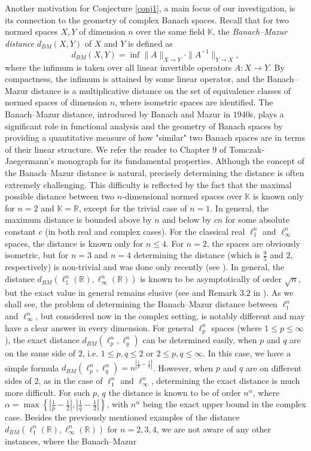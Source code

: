 \documentclass[12pt, a4paper]{article}
\theoremstyle{plain} %
\theoremstyle{definition} %
\theoremstyle{remark} %
\begin{document}
Another motivation for Conjecture \ref{conj1}, a main focus of our investigation, is its connection to the geometry of complex Banach spaces. Recall that for two normed spaces $X, Y$ of dimension $n$ over the same field $\mathbb{K}$, the \emph{Banach--Mazur distance} $d_{BM}(X, Y)$ of $X$ and $Y$ is defined as
$$d_{BM}(X, Y) = \inf \|A\|_{X \to Y} \cdot \|A^{-1}\|_{Y \to X},$$
where the infimum is taken over all linear invertible operators $A: X \to Y$. By compactness, the infimum is attained by some linear operator, and the Banach--Mazur distance is a multiplicative distance on the set of equivalence classes of normed spaces of dimension $n$, where isometric spaces are identified. The Banach--Mazur distance, introduced by Banach and Mazur in $1940$s, plays a significant role in functional analysis and the geometry of Banach spaces by providing a quantitative measure of how "similar" two Banach spaces are in terms of their linear structure. We refer the reader to Chapter $9$ of Tomczak-Jaegermann's monograph \cite{ntj} for its fundamental properties.  Although the concept of the Banach--Mazur distance is natural, precisely determining the distance is often extremely challenging. This difficulty is reflected by the fact that the maximal possible distance between two $n$-dimensional normed spaces over $\mathbb{K}$ is known only for $n=2$ and $\mathbb{K}=\mathbb{R}$, except for the trivial case of $n=1$. In general, the maximum distance is bounded above by $n$ and below by $cn$ for some absolute constant $c$ (in both real and complex cases). For the classical real $\ell_1^n$ and $\ell_{\infty}^n$ spaces, the distance is known only for $n \leq 4$. For $n=2$, the spaces are obviously isometric, but for $n=3$ and $n=4$ determining the distance (which is $\frac{9}{5}$ and $2$, respectively) is non-trivial and was done only recently (see \cite{kobosvarivoda}). In general, the distance $d_{BM}(\ell_1^n(\mathbb{R}), \ell_{\infty}^n(\mathbb{R}))$ is known to be asymptotically of order $\sqrt{n}$, but the exact value in general remains elusive (see \cite{xue} and Remark $3.2$ in \cite{kobosvarivoda}). As we shall see, the problem of determining the Banach--Mazur distance between $\ell_1^n$ and $\ell_{\infty}^n$, but considered now in the complex setting, is notably different and may have a clear answer in every dimension. For general $\ell_p^n$ spaces (where $1 \leq p \leq \infty$), the exact distance $d_{BM}(\ell_p^n, \ell_q^n)$ can be determined easily, when $p$ and $q$ are on the same side of $2$, i.e. $1 \leq p, q \leq 2$ or $2 \leq p, q \leq \infty$. In this case, we have a simple formula $d_{BM}(\ell_p^n, \ell_q^n)=n^{\left |\frac{1}{p}-\frac{1}{q} \right |}$. However, when $p$ and $q$ are on different sides of $2$, as in the case of $\ell_1^n$ and $\ell_{\infty}^n$, determining the exact distance is much more difficult. For such $p$, $q$ the distance is known to be of order  $n^{\alpha}$, where $\alpha = \max \left \{ \left | \frac{1}{p}-\frac{1}{2} \right |,  \left | \frac{1}{q}-\frac{1}{2} \right | \right \}$, with $n^{\alpha}$ being the exact upper bound in the complex case. Besides the previously mentioned examples of the distance $d_{BM}(\ell_1^n(\mathbb{R}), \ell_{\infty}^n(\mathbb{R}))$ for $n=2, 3, 4$, we are not aware of any other instances, where the Banach--Mazur 
\end{document}
